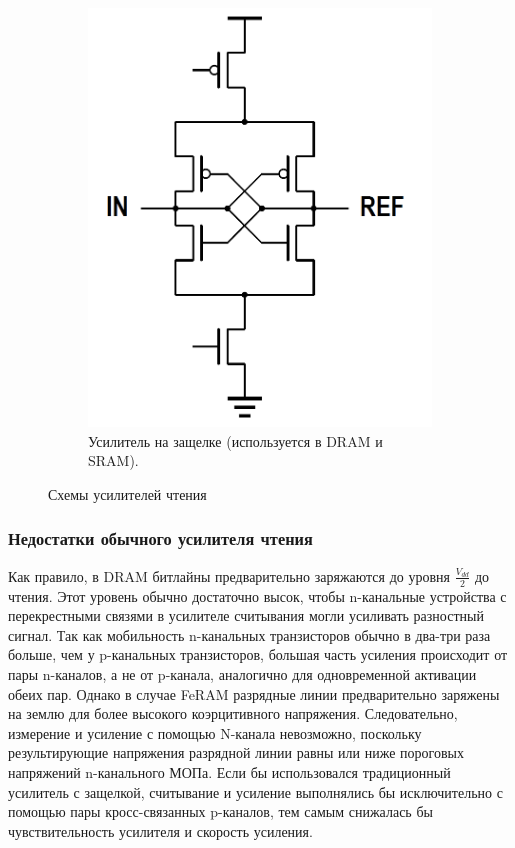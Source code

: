\documentclass[a4paper,12pt]{article} %
\begin{document}
\begin{figure}
\begin{subfigure}[b]{0.5\textwidth}
    \includegraphics[width=\textwidth]{SemAmp.png}
    \caption{Усилитель на защелке (используется в DRAM и SRAM).}
    \label{amp:2}
  \end{subfigure}
  \caption{Схемы усилителей чтения}
\end{figure}

\subsubsection{Недостатки обычного усилителя чтения}
Как правило, в DRAM битлайны предварительно заряжаются до уровня  $\frac{V_{dd}}{2} $ до чтения. Этот уровень обычно достаточно высок, чтобы n-канальные устройства с перекрестными связями в усилителе считывания могли усиливать разностный сигнал. Так как мобильность n-канальных транзисторов обычно в два-три раза больше, чем у p-канальных транзисторов,
большая часть усиления происходит от пары n-каналов, а не от p-канала,
аналогично для одновременной активации обеих пар. Однако в случае FeRAM разрядные линии предварительно заряжены на землю  для более высокого коэрцитивного напряжения. Следовательно, измерение и усиление с помощью N-канала невозможно, поскольку результирующие напряжения разрядной линии равны или ниже пороговых напряжений n-канального МОПа. Если бы использовался традиционный усилитель с защелкой, считывание и усиление выполнялись бы исключительно с помощью пары кросс-связанных p-каналов, тем самым снижалась бы чувствительность усилителя и скорость усиления.
\end{document}

